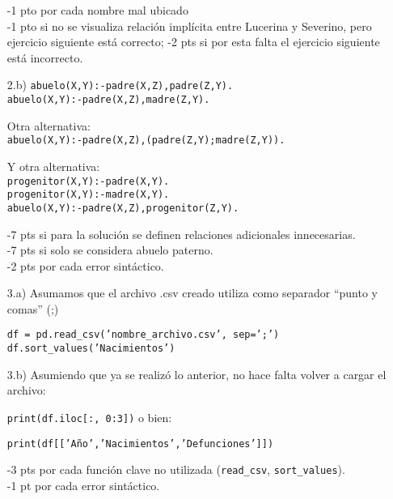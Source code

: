 \documentclass[letter,12pt,oneside]{book}
\theoremstyle{definition}
\begin{document}
\begin{enumerate}
    -1 pto por cada nombre mal ubicado\\
    -1 pto si no se visualiza relación implícita entre Lucerina y Severino, pero ejercicio siguiente está correcto; -2 pts si por esta falta el ejercicio siguiente está incorrecto.

    \item[2.b)]
    \texttt{abuelo(X,Y):-padre(X,Z),padre(Z,Y).}\\
    \texttt{abuelo(X,Y):-padre(X,Z),madre(Z,Y).}
    
    Otra alternativa:\\
    \texttt{abuelo(X,Y):-padre(X,Z),(padre(Z,Y);madre(Z,Y)).}
    
    Y otra alternativa:\\
    \texttt{progenitor(X,Y):-padre(X,Y).}\\
    \texttt{progenitor(X,Y):-madre(X,Y).}\\
    \texttt{abuelo(X,Y):-padre(X,Z),progenitor(Z,Y).}
    
    -7 pts si para la solución se definen relaciones adicionales innecesarias.\\
    -7 pts si solo se considera abuelo paterno.\\
    -2 pts por cada error sintáctico.
    
    \item[3.a)] Asumamos que el archivo .csv creado utiliza como separador ``punto y comas'' (;)
    
    \texttt{df = pd.read\_csv('nombre\_archivo.csv', sep=';')}\\
    \texttt{df.sort\_values('Nacimientos')}
    
    \item[3.b)] Asumiendo que ya se realizó lo anterior, no hace falta volver a cargar el archivo:
    
    \texttt{print(df.iloc[:, 0:3])}\tabto{30ex} o bien:
    
    \texttt{print(df[['Año','Nacimientos','Defunciones']])}
    
    -3 pts por cada función clave no utilizada (\texttt{read\_csv}, \texttt{sort\_values}).\\
    -1 pt por cada error sintáctico.

\end{enumerate}
\end{document}
